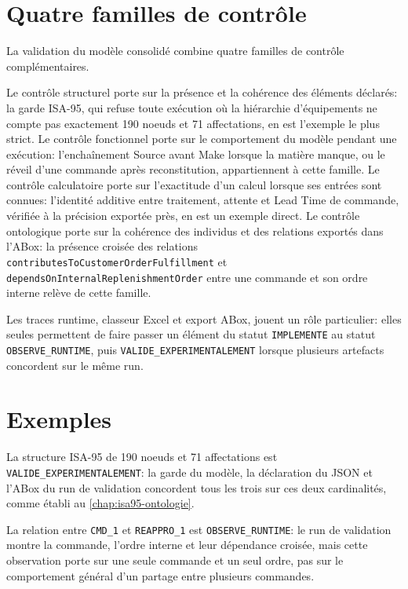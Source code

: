 \section{Quatre familles de contrôle}

La validation du modèle consolidé combine quatre familles de contrôle complémentaires.

Le contrôle structurel porte sur la présence et la cohérence des éléments déclarés: la garde ISA-95, qui refuse toute exécution où la hiérarchie d'équipements ne compte pas exactement 190 noeuds et 71 affectations, en est l'exemple le plus strict. Le contrôle fonctionnel porte sur le comportement du modèle pendant une exécution: l'enchaînement Source avant Make lorsque la matière manque, ou le réveil d'une commande après reconstitution, appartiennent à cette famille. Le contrôle calculatoire porte sur l'exactitude d'un calcul lorsque ses entrées sont connues: l'identité additive entre traitement, attente et Lead Time de commande, vérifiée à la précision exportée près, en est un exemple direct. Le contrôle ontologique porte sur la cohérence des individus et des relations exportés dans l'ABox: la présence croisée des relations \texttt{contributesToCustomerOrderFulfillment} et \texttt{dependsOnInternalReplenishmentOrder} entre une commande et son ordre interne relève de cette famille.

\begin{sloppypar}
Les traces runtime, classeur Excel et export ABox, jouent un rôle particulier: elles seules permettent de faire passer un élément du statut \texttt{IMPLEMENTE} au statut \texttt{OBSERVE\_RUNTIME}, puis \texttt{VALIDE\_EXPERIMENTALEMENT} lorsque plusieurs artefacts concordent sur le même run.
\end{sloppypar}


\section{Exemples}

La structure ISA-95 de 190 noeuds et 71 affectations est \texttt{VALIDE\_EXPERIMENTALEMENT}: la garde du modèle, la déclaration du JSON et l'ABox du run de validation concordent tous les trois sur ces deux cardinalités, comme établi au \cref{chap:isa95-ontologie}.

La relation entre \texttt{CMD\_1} et \texttt{REAPPRO\_1} est \texttt{OBSERVE\_RUNTIME}: le run de validation montre la commande, l'ordre interne et leur dépendance croisée, mais cette observation porte sur une seule commande et un seul ordre, pas sur le comportement général d'un partage entre plusieurs commandes.


